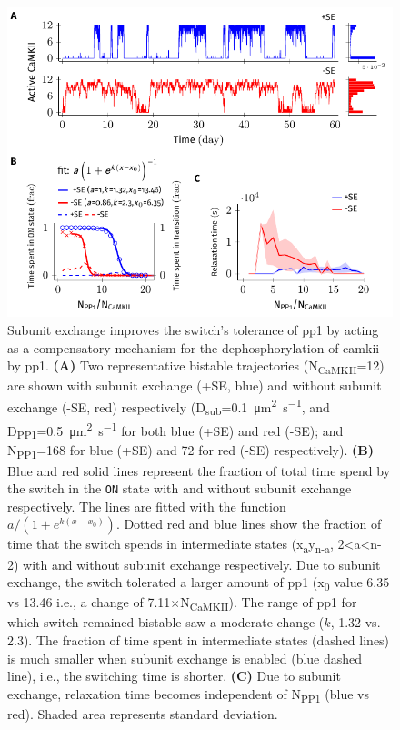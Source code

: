 \documentclass[9pt,lineno,doublespacing]{elife}
\newcommand\SUB[2]{#1\textsubscript{#2}}
\begin{document}
\begin{figure}[ht]
    \includegraphics[width=140mm]{PaperFigures/elifeFigure2/figure_effect_of_tolerace_140mm.pdf}
    \caption{Subunit exchange improves the switch's tolerance of \gls{pp1} by
        acting as a compensatory mechanism for the dephosphorylation of
        \gls{camkii} by \gls{pp1}.
        \textbf{(A)} Two representative bistable trajectories (\SUB{N}{CaMKII}=12) are
        shown with subunit exchange (+SE, blue) and without subunit exchange
        (-SE, red) respectively
        (\SUB{D}{sub}=\SI{0.1}{\micro\meter\squared\per\second}, and
        \SUB{D}{PP1}=\SI{0.5}{\micro\meter\squared\per\second} for both blue
        (+SE) and red (-SE); and \SUB{N}{PP1}=168 for blue (+SE) and 72 for red
        (-SE) respectively).
        \textbf{(B)} Blue and red solid lines represent the fraction of total 
        time spend by the switch in the \texttt{ON} state with and without subunit
        exchange respectively. The lines are fitted with the 
        function \({a}/\left({1+e^{k(x-x_0)}}\right)\).
        Dotted red and blue lines show the fraction of time that the switch
        spends in intermediate states (\SUB{x}{a}\SUB{y}{n-a}, 2<a<n-2) with
        and without subunit exchange respectively. Due to subunit exchange,
        the switch tolerated a larger amount of \gls{pp1} 
        (\SUB{x}{0} value 6.35  vs 13.46 i.e., a change of 7.11$\times$\SUB{N}{CaMKII}).
        The range of \gls{pp1} for which switch remained bistable saw a moderate
        change ($k$, 1.32 vs. 2.3). The fraction of time spent in intermediate states
        (dashed lines) is much smaller when subunit exchange is enabled (blue
        dashed line),
        i.e., the switching time is shorter. 
        \textbf{(C)} Due to subunit exchange, relaxation time becomes independent 
        of \SUB{N}{PP1} (blue vs red). Shaded area represents standard deviation.
    }\label{fig:tolerance_pp1}
\end{figure}
\end{document}
